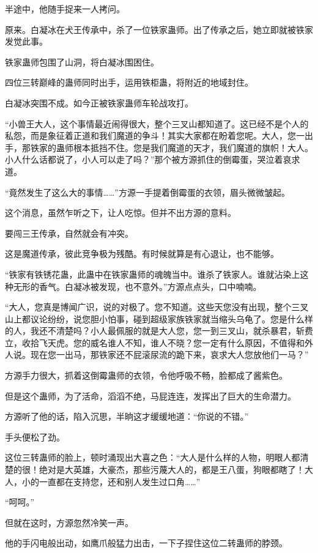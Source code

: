 \begin{this_body}
半途中，他随手捉来一人拷问。

原来。白凝冰在犬王传承中，杀了一位铁家蛊师。出了传承之后，她立即就被铁家发觉此事。

铁家蛊师包围了山洞，将白凝冰围困住。

四位三转巅峰的蛊师同时出手，运用铁柜蛊，将附近的地域封住。

白凝冰突围不成。如今正被铁家蛊师车轮战攻打。

“小兽王大人，这个事情最近闹得很大，整个三叉山都知道了。这已经不是个人的私怨，而是象征着正道和我们魔道的争斗！其实大家都在盼着您呢。大人，您一出手，那铁家的蛊师根本抵挡不住。您是我们魔道的天才，我们魔道的旗帜！大人。小人什么话都说了，小人可以走了吗？”那个被方源抓住的倒霉蛋，哭泣着哀求道。

“竟然发生了这么大的事情……”方源一手提着倒霉蛋的衣领，眉头微微皱起。

这个消息，虽然乍听之下，让人吃惊。但并不出方源的意料。

要闯三王传承，自然就会有冲突。

这是魔道传承，彼此竞争极为残酷。有时候就算是有心退让，也不能够。

“铁家有铁锈花蛊，此蛊中在铁家蛊师的魂魄当中。谁杀了铁家人。谁就沾染上这种无形的香气。白凝冰被发现，也不意外。”方源点点头，口中喃喃。

“大人，您真是博闻广识，说的对极了。您不知道。这些天您没有出现，整个三叉山上都议论纷纷，说您胆小怕事，碰到超级家族铁家就当缩头乌龟了。您是什么样的人，我还不清楚吗？小人最佩服的就是大人您，您一到三叉山，就杀暴君，斩费立，收拾飞天虎。您的威名谁人不知，谁人不晓？您一定有什么原因，不值得和外人说。现在您一出马，那铁家还不屁滚尿流的跪下来，哀求大人您放他们一马？”

方源手力很大，抓着这倒霉蛊师的衣领，令他呼吸不畅，脸都成了酱紫色。

但是这个蛊师，为了活命，滔滔不绝，马屁连连，发挥出了巨大的生命潜力。

方源听了他的话，陷入沉思，半晌这才缓缓地道：“你说的不错。”

手头便松了劲。

这位三转蛊师的脸上，顿时涌现出大喜之色：“大人是什么样的人物，明眼人都清楚的很！绝对是大英雄，大豪杰，那些污蔑大人的，都是王八蛋，狗眼都瞎了！大人，小的一直都在支持您，还和别人发生过口角……”

“呵呵。”

但就在这时，方源忽然冷笑一声。

他的手闪电般出动，如鹰爪般猛力出击，一下子捏住这位二转蛊师的脖颈。


\end{this_body}
